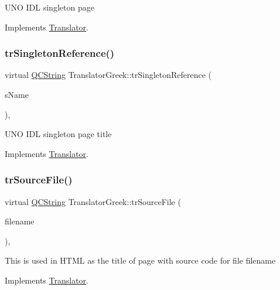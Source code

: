 U\+NO I\+DL singleton page 

Implements \mbox{\hyperlink{class_translator}{Translator}}.

\mbox{\label{class_translator_greek_ae2752ef64b7b0954b98781d92b932731}} 
\subsubsection{\texorpdfstring{trSingletonReference()}{trSingletonReference()}}
{\footnotesize\ttfamily virtual \mbox{\hyperlink{class_q_c_string}{Q\+C\+String}} Translator\+Greek\+::tr\+Singleton\+Reference (\begin{DoxyParamCaption}\item[{const char $\ast$}]{s\+Name }\end{DoxyParamCaption})\hspace{0.3cm}{\ttfamily [inline]}, {\ttfamily [virtual]}}

U\+NO I\+DL singleton page title 

Implements \mbox{\hyperlink{class_translator}{Translator}}.

\mbox{\label{class_translator_greek_a21ef7d1e395a1a1171e172bdf0e22fd7}} 
\subsubsection{\texorpdfstring{trSourceFile()}{trSourceFile()}}
{\footnotesize\ttfamily virtual \mbox{\hyperlink{class_q_c_string}{Q\+C\+String}} Translator\+Greek\+::tr\+Source\+File (\begin{DoxyParamCaption}\item[{\mbox{\hyperlink{class_q_c_string}{Q\+C\+String}} \&}]{filename }\end{DoxyParamCaption})\hspace{0.3cm}{\ttfamily [inline]}, {\ttfamily [virtual]}}

This is used in H\+T\+ML as the title of page with source code for file filename 

Implements \mbox{\hyperlink{class_translator}{Translator}}.

